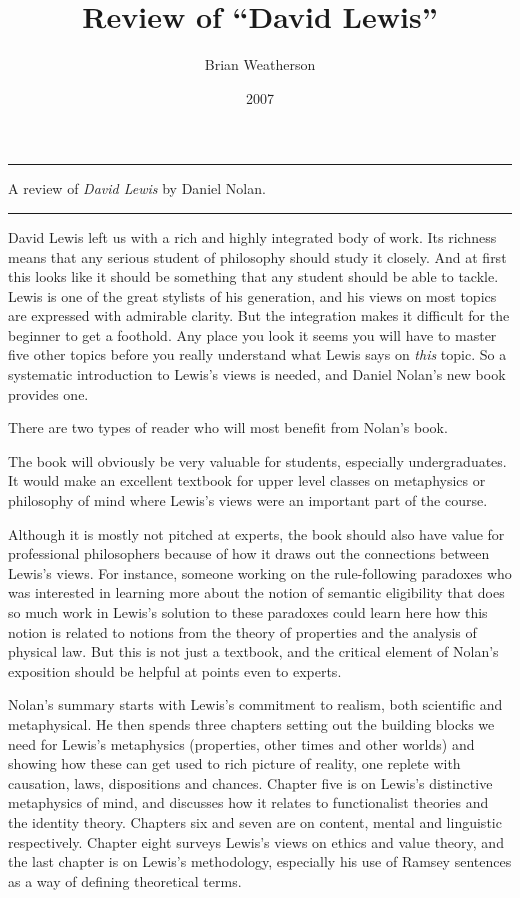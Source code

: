 \documentclass[
  10pt,
  letterpaper,
  DIV=11,
  numbers=noendperiod,
  twoside]{scrartcl}
\title{Review of ``David Lewis''}
\author{Brian Weatherson}
\date{2007}
\renewenvironment{abstract}
 {\vspace{-1.25cm}
 \quotation\small\noindent\rule{\linewidth}{.5pt}\par\smallskip
 \noindent }
 {\par\noindent\rule{\linewidth}{.5pt}\endquotation}
\begin{document}
\maketitle
\begin{abstract}
A review of \emph{David Lewis} by Daniel Nolan.
\end{abstract}

David Lewis left us with a rich and highly integrated body of work. Its
richness means that any serious student of philosophy should study it
closely. And at first this looks like it should be something that any
student should be able to tackle. Lewis is one of the great stylists of
his generation, and his views on most topics are expressed with
admirable clarity. But the integration makes it difficult for the
beginner to get a foothold. Any place you look it seems you will have to
master five other topics before you really understand what Lewis says on
\emph{this} topic. So a systematic introduction to Lewis's views is
needed, and Daniel Nolan's new book provides one.

There are two types of reader who will most benefit from Nolan's book.

The book will obviously be very valuable for students, especially
undergraduates. It would make an excellent textbook for upper level
classes on metaphysics or philosophy of mind where Lewis's views were an
important part of the course.

Although it is mostly not pitched at experts, the book should also have
value for professional philosophers because of how it draws out the
connections between Lewis's views. For instance, someone working on the
rule-following paradoxes who was interested in learning more about the
notion of semantic eligibility that does so much work in Lewis's
solution to these paradoxes could learn here how this notion is related
to notions from the theory of properties and the analysis of physical
law. But this is not just a textbook, and the critical element of
Nolan's exposition should be helpful at points even to experts.

Nolan's summary starts with Lewis's commitment to realism, both
scientific and metaphysical. He then spends three chapters setting out
the building blocks we need for Lewis's metaphysics (properties, other
times and other worlds) and showing how these can get used to rich
picture of reality, one replete with causation, laws, dispositions and
chances. Chapter five is on Lewis's distinctive metaphysics of mind, and
discusses how it relates to functionalist theories and the identity
theory. Chapters six and seven are on content, mental and linguistic
respectively. Chapter eight surveys Lewis's views on ethics and value
theory, and the last chapter is on Lewis's methodology, especially his
use of Ramsey sentences as a way of defining theoretical terms.
\end{document}
